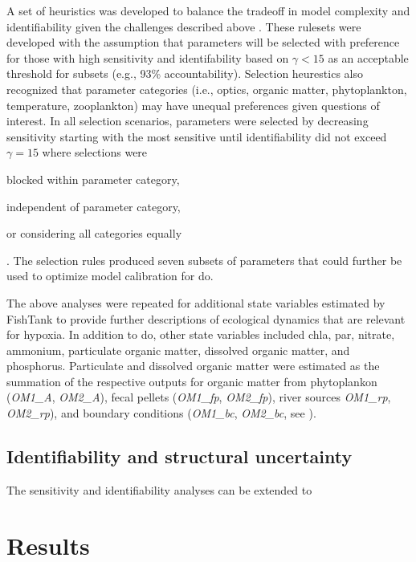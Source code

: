 \documentclass[letterpaper,12pt,oneside]{article}\usepackage[]{graphicx}\usepackage[]{color}
\begin{document}
A set of heuristics was developed to balance the tradeoff in model complexity and identifiability given the challenges described above \citep[see also][]{Wagener01}.  These rulesets were developed with the assumption that parameters will be selected with preference for those with high sensitivity and identifability based on $\gamma < 15$ as an acceptable threshold for subsets (e.g., 93\% accountability).  Selection heurestics also recognized that parameter categories (i.e., optics, organic matter, phytoplankton, temperature, zooplankton) may have unequal preferences given questions of interest.  In all selection scenarios, parameters were selected by decreasing sensitivity starting with the most sensitive until identifiability did not exceed $\gamma = 15$ where selections were \begin{inparaenum}[1\upshape)]
\item blocked within parameter category,
\item independent of parameter category,
\item or considering all categories equally
\end{inparaenum}.  The selection rules produced seven subsets of parameters that could further be used to optimize model calibration for \ac{do}.

The above analyses were repeated for additional state variables estimated by FishTank to provide further descriptions of ecological dynamics that are relevant for hypoxia.  In addition to \ac{do}, other state variables included \ac{chla}, \ac{par}, nitrate, ammonium, particulate organic matter, dissolved organic matter, and phosphorus.  Particulate and dissolved organic matter were estimated as the summation of the respective outputs for organic matter from phytoplankon (\textit{OM1\_A}, \textit{OM2\_A}), fecal pellets (\textit{OM1\_fp}, \textit{OM2\_fp}), river sources \textit{OM1\_rp}, \textit{OM2\_rp}), and boundary conditions (\textit{OM1\_bc}, \textit{OM2\_bc}, see ). 

\subsection{Identifiability and structural uncertainty}

The sensitivity and identifiability analyses can be extended to 

\section{Results}
\end{document}
